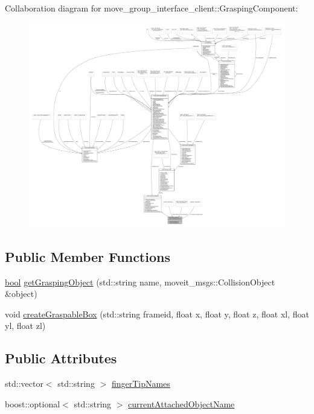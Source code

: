 Collaboration diagram for move\+\_\+group\+\_\+interface\+\_\+client\+:\+:Grasping\+Component\+:
\nopagebreak
\begin{figure}[H]
\begin{center}
\leavevmode
\includegraphics[width=350pt]{classmove__group__interface__client_1_1GraspingComponent__coll__graph}
\end{center}
\end{figure}
\subsection*{Public Member Functions}
\begin{DoxyCompactItemize}
\item 
\hyperlink{classbool}{bool} \hyperlink{classmove__group__interface__client_1_1GraspingComponent_ad3b8583ead160cf3fca89809c9880f1e}{get\+Grasping\+Object} (std\+::string name, moveit\+\_\+msgs\+::\+Collision\+Object \&object)
\item 
void \hyperlink{classmove__group__interface__client_1_1GraspingComponent_aee05ddd624cf0d5ff773e7517999d31f}{create\+Graspable\+Box} (std\+::string frameid, float x, float y, float z, float xl, float yl, float zl)
\end{DoxyCompactItemize}
\subsection*{Public Attributes}
\begin{DoxyCompactItemize}
\item 
std\+::vector$<$ std\+::string $>$ \hyperlink{classmove__group__interface__client_1_1GraspingComponent_a31afa10c937b168174e02d322a300c4d}{finger\+Tip\+Names}
\item 
boost\+::optional$<$ std\+::string $>$ \hyperlink{classmove__group__interface__client_1_1GraspingComponent_aa1098467cb6a739228c3ed1a3f66c095}{current\+Attached\+Object\+Name}
\end{DoxyCompactItemize}
